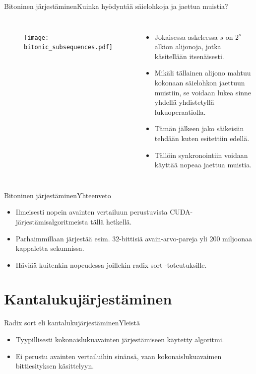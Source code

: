 \documentclass{beamer}
\begin{document}
\begin{frame}{Bitoninen järjestäminen}{Kuinka hyödyntää säielohkoja ja jaettua muistia?}
\begin{columns}
    \begin{figure}
        \texttt{[image: bitonic\_subsequences.pdf]}
    \end{figure}
    \begin{itemize}
      \item
        Jokaisessa askeleessa $s$ on $2^s$ alkion alijonoja, jotka käsitellään itsenäisesti.
      \item
        Mikäli tällainen alijono mahtuu kokonaan säielohkon jaettuun muistiin, se voidaan lukea sinne yhdellä yhdistetyllä lukuoperaatiolla.
      \item
        Tämän jälkeen jako säikeisiin tehdään kuten esitettiin edellä.
      \item
        Tällöin synkronointiin voidaan käyttää nopeaa jaettua muistia.
    \end{itemize}
\end{columns}
\end{frame}

\begin{frame}{Bitoninen järjestäminen}{Yhteenveto}
    \begin{itemize}
      \item
        Ilmeisesti nopein avainten vertailuun perustuvista CUDA-järjestämisalgoritmeista tällä hetkellä.
      \item
        Parhaimmillaan järjestää esim. 32-bittisiä avain-arvo-pareja yli 200 miljoonaa kappaletta sekunnissa.
      \item
        Häviää kuitenkin nopeudessa joillekin radix sort -toteutuksille.
    \end{itemize}
\end{frame}

\section{Kantalukujärjestäminen}

\begin{frame}{Radix sort eli kantalukujärjestäminen}{Yleistä}
    \begin{itemize}
      \item
        Tyypillisesti kokonaislukuavainten järjestämiseen käytetty algoritmi.
      \item
        Ei perustu avainten vertailuihin sinänsä, vaan kokonaislukuavaimen bittiesityksen käsittelyyn.
    \end{itemize}
\end{frame}
\end{document}
